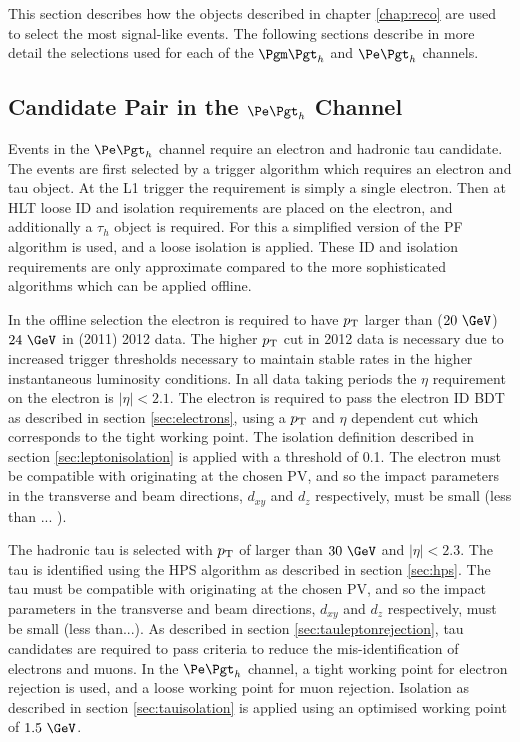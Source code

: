 This section describes how the objects described in chapter
\ref{chap:reco} are used to select the most signal-like events. 
The following sections describe in more detail the selections
used for each of the $\mutau$ and $\etau$ channels.

\subsection{Candidate Pair in the $\etau$ Channel}

Events in the $\etau$ channel require an electron and hadronic tau
candidate. The events are first selected by a trigger algorithm which requires
an electron and tau object. At the \ac{L1} trigger the requirement is simply a
single electron. Then at \ac{HLT} loose ID and isolation requirements are placed on the
electron, and additionally a $\tau_{h}$ object is required. For
this a simplified version of the \ac{PF} algorithm is used, and a loose
isolation is applied. These ID and isolation requirements are only approximate
compared to the more sophisticated algorithms which can be applied offline.  

In the offline selection the electron is required to have $p_{\mathrm{T}}$ larger than ($20~\GeV$)
$24~\GeV$ in (2011) 2012 data. The higher $p_{\mathrm{T}}$ cut in 2012 data is necessary
due to increased trigger thresholds necessary to maintain stable rates in the
higher instantaneous luminosity conditions. In all data taking periods the $\eta$ requirement
on the electron is $|\eta| < 2.1$. The electron is required to pass the electron
ID \ac{BDT} as described in section \ref{sec:electrons}, using a $p_{\mathrm{T}}$ and
$\eta$ dependent cut which corresponds to the tight working point.  
The isolation definition described in section \ref{sec:leptonisolation} is
applied with a threshold of 0.1. The electron must be compatible with
originating at the chosen \ac{PV}, and so the impact parameters in the
transverse and beam directions, $d_{xy}$ and $d_{z}$ respectively, must be
small (less than ... ). 

The hadronic tau is selected with $p_{\mathrm{T}}$ of larger than $30~\GeV$ and
$|\eta|<2.3$. The tau is identified using the \ac{HPS} algorithm as described in 
section \ref{sec:hps}. The tau must be compatible with
originating at the chosen \ac{PV}, and so the impact parameters in the
transverse and beam directions, $d_{xy}$ and $d_{z}$ respectively, must be
small (less than...). As described in section \ref{sec:tauleptonrejection}, 
tau candidates are required to pass criteria to reduce the mis-identification of electrons and
muons. In the $\etau$ channel, a tight working point for electron rejection is
used, and a loose working point for muon rejection. Isolation as described in
section \ref{sec:tauisolation} is applied using an optimised working point of
$1.5~\GeV$.  


